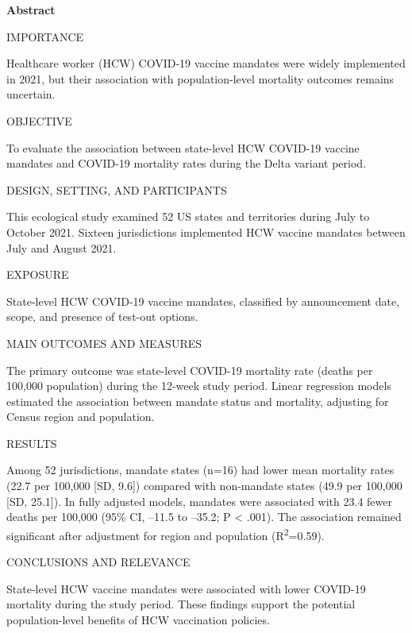 \documentclass[10pt, letterpaper]{article}
\newcommand{\abslabel}[1]{%
  {\vspace{4pt}\noindent\sffamily\fontseries{b}\selectfont\fontsize{8.5}{10}\selectfont #1\enspace}%
}
\newcommand{\absrule}{%
  \vspace{3pt}\noindent{\color{jamacrimson}\rule{0.62\textwidth}{0.4pt}}\vspace{3pt}%
}
\begin{document}
\noindent
\begin{minipage}[t]{0.62\textwidth}
{\sffamily\bfseries\fontsize{11}{13}\selectfont\color{jamacrimson} Abstract\par}
\vspace{4pt}

\abslabel{IMPORTANCE}
{\fontsize{9}{11.5}\selectfont
Healthcare worker (HCW) COVID-19 vaccine mandates were widely implemented in 2021, but their association with population-level mortality outcomes remains uncertain.\par}

\absrule

\abslabel{OBJECTIVE}
{\fontsize{9}{11.5}\selectfont
To evaluate the association between state-level HCW COVID-19 vaccine mandates and COVID-19 mortality rates during the Delta variant period.\par}

\absrule

\abslabel{DESIGN, SETTING, AND PARTICIPANTS}
{\fontsize{9}{11.5}\selectfont
This ecological study examined 52 US states and territories during July to October 2021. Sixteen jurisdictions implemented HCW vaccine mandates between July and August 2021.\par}

\absrule

\abslabel{EXPOSURE}
{\fontsize{9}{11.5}\selectfont
State-level HCW COVID-19 vaccine mandates, classified by announcement date, scope, and presence of test-out options.\par}

\absrule

\abslabel{MAIN OUTCOMES AND MEASURES}
{\fontsize{9}{11.5}\selectfont
The primary outcome was state-level COVID-19 mortality rate (deaths per 100,000 population) during the 12-week study period. Linear regression models estimated the association between mandate status and mortality, adjusting for Census region and population.\par}

\absrule

\abslabel{RESULTS}
{\fontsize{9}{11.5}\selectfont
Among 52 jurisdictions, mandate states (n=16) had lower mean mortality rates (22.7 per 100,000 [SD, 9.6]) compared with non-mandate states (49.9 per 100,000 [SD, 25.1]). In fully adjusted models, mandates were associated with 23.4 fewer deaths per 100,000 (95\% CI, --11.5 to --35.2; P < .001). The association remained significant after adjustment for region and population (R\textsuperscript{2}=0.59).\par}

\absrule

\abslabel{CONCLUSIONS AND RELEVANCE}
{\fontsize{9}{11.5}\selectfont
State-level HCW vaccine mandates were associated with lower COVID-19 mortality during the study period. These findings support the potential population-level benefits of HCW vaccination policies.\par}

\vspace{4pt}
\noindent{\color{jamalightgray}\rule{0.62\textwidth}{0.4pt}}


\end{minipage}%
\end{document}
